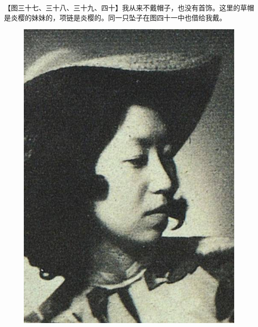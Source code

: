 \clearpage
\par 【图三十七、三十八、三十九、四十】我从来不戴帽子，也没有首饰。这里的草帽是炎樱的妹妹的，项链是炎樱的。同一只坠子在图四十一中也借给我戴。
\begin{figure}[htb]
    \centering %
    \includegraphics[scale=0.35]{picture/对照记37.jpeg}

\end{figure}
